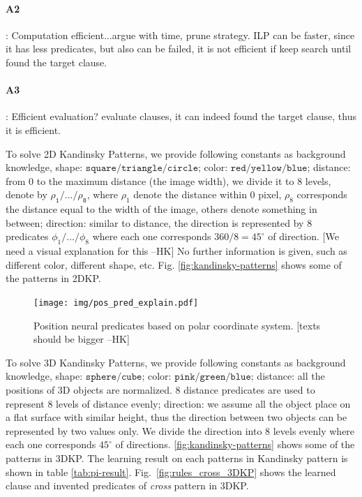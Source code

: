 \documentclass[
]{ceurart}
\newcommand{\hk}[1]{\textcolor{Apricot}{[#1 \textsc{--HK}]}}
\begin{document}
	\paragraph{A2}:
	Computation efficient...argue with time, prune strategy.
	ILP can be faster, since it has less predicates, but also can be failed, it is not efficient if keep search until found the target clause.
	
	
	\paragraph{A3}:
	Efficient evaluation? 
	evaluate clauses, it can indeed found the target clause, thus it is efficient.
	
	To solve 2D Kandinsky Patterns, we provide following constants as background knowledge, 
	shape: $\mathtt{square/triangle/circle}$; 
	color: $\mathtt{red/yellow/blue}$; 
	distance: from 0 to the maximum distance (the image width), we divide it to 8 levels, denote by $\mathtt{\rho_1/.../\rho_8}$, where $\rho_1 $ denote the distance within 0 pixel, $\rho_8$ corresponds the distance equal to the width of the image, others denote something in between; 
	direction: similar to distance, the direction is represented by 8 predicates $\phi_1/.../\phi_8 $ where each one corresponds $360/8=45^\circ$ of direction. \hk{We need a visual explanation for this}
	No further information is given, such as different color, different shape, etc. Fig. \ref{fig:kandinsky-patterns} shows some of the patterns in 2DKP. 
	
	\begin{figure}[t]%
		\centering
		\texttt{[image: img/pos\_pred\_explain.pdf]}
		\caption{Position neural predicates based on polar coordinate system. \hk{texts should be bigger}}
		\label{fig:pos-pred-explain}
	\end{figure}
	
	To solve 3D Kandinsky Patterns, we provide following constants as background knowledge, 
	shape: $\mathtt{sphere/cube}$; 
	color: $\mathtt{pink/green/blue}$; 
	distance: all the positions of 3D objects are normalized. 8 distance predicates  are used to represent 8 levels of distance evenly;
	direction: we assume all the object place on a flat surface with similar height, thus the direction between two objects can be represented by two values only. We divide the direction into 8 levels evenly where each one corresponds $45^\circ$ of directions.
	\ref{fig:kandinsky-patterns} shows some of the patterns in 3DKP.
	The learning result on each patterns in Kandinsky pattern is shown in table \ref{tab:pi-result}.
	Fig.~\ref{fig:rules_cross_3DKP} shows the learned clause and invented predicates of \textit{cross} pattern in 3DKP.
	
\end{document}
